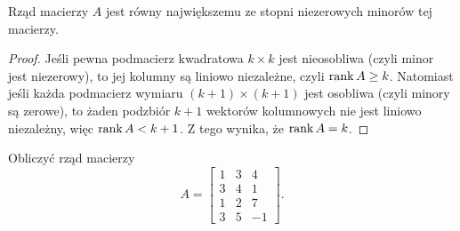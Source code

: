 \begin{theorem}
    \label{t:rank = max order of nonzero minor}
    Rząd macierzy $A$ jest równy największemu ze stopni niezerowych minorów tej macierzy.
\end{theorem}
\begin{proof}
    Jeśli pewna podmacierz kwadratowa $k \times k$ jest nieosobliwa (czyli minor jest niezerowy), to jej kolumny są liniowo niezależne, czyli $\operatorname{rank} A \geq k$. Natomiast jeśli każda podmacierz wymiaru $(k + 1) \times (k + 1)$ jest osobliwa (czyli minory są zerowe), to żaden podzbiór $k + 1$ wektorów kolumnowych nie jest liniowo niezależny, więc $\operatorname{rank} A < k + 1$. Z tego wynika, że $\operatorname{rank} A = k$.
\end{proof}

\begin{example}
    Obliczyć rząd macierzy
    \[ A = \begin{bmatrix}
        1 & 3 & 4 \\
        3 & 4 & 1 \\
        1 & 2 & 7 \\
        3 & 5 & -1
    \end{bmatrix}. \]
\end{example}
